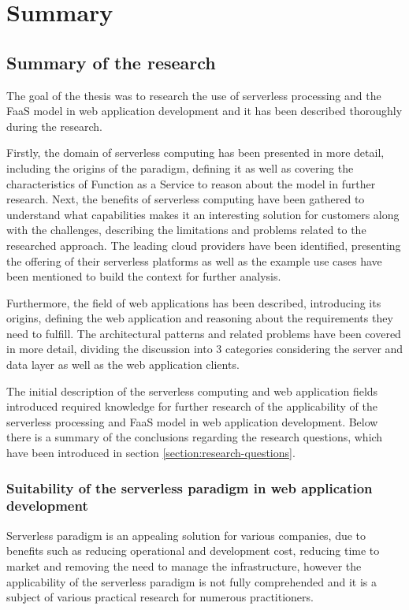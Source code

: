 \chapter{Summary}

\section{Summary of the research}

The goal of the thesis was to research the use of serverless processing and the FaaS model in web application development and it has been described thoroughly during the research.

Firstly, the domain of serverless computing has been presented in more detail, including the origins of the paradigm, defining it as well as covering the characteristics of Function as a Service to reason about the model in further research.
Next, the benefits of serverless computing have been gathered to understand what capabilities makes it an interesting solution for customers along with the challenges, describing the limitations and problems related to the researched approach.
The leading cloud providers have been identified, presenting the offering of their serverless platforms as well as the example use cases have been mentioned to build the context for further analysis.

Furthermore, the field of web applications has been described, introducing its origins, defining the web application and reasoning about the requirements they need to fulfill.
The architectural patterns and related problems have been covered in more detail, dividing the discussion into 3 categories considering the server and data layer as well as the web application clients.

The initial description of the serverless computing and web application fields introduced required knowledge for further research of the applicability of the serverless processing and FaaS model in web application development.
Below there is a summary of the conclusions regarding the research questions, which have been introduced in section \ref{section:research-questions}.

\subsection{Suitability of the serverless paradigm in web application development}

Serverless paradigm is an appealing solution for various companies, due to benefits such as reducing operational and development cost, reducing time to market and removing the need to manage the infrastructure, however the applicability of the serverless paradigm is not fully comprehended and it is a subject of various practical research for numerous practitioners.

